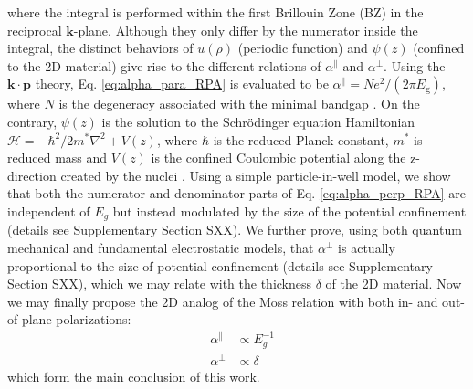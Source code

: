 \documentclass[journal=ancac3,manuscript=article,email=true,hyperref=true,keywords=false]{achemso}
\begin{document}
where the integral is performed within the first Brillouin Zone (BZ)
in the reciprocal $\mathbf{k}$-plane. Although they only differ by the
numerator inside the integral, the distinct behaviors of $u(\rho)$
(periodic function) and $\psi(z)$ (confined to the 2D material) give
rise to the different relations of $\alpha^{\parallel}$ and
$\alpha^{\perp}$. Using the $\mathbf{k} \cdot \mathbf{p}$ theory,
Eq. \ref{eq:alpha_para_RPA} is evaluated to be
$\alpha^{\parallel} = N e^{2}/(2\pi E_{\mathrm{g}})$, where $N$ is the
degeneracy associated with the minimal bandgap
\cite{Jiang_2017_Eg_Eb}. On the contrary, $\psi(z)$ is the solution to
the Schr\"{o}dinger equation Hamiltonian
$\mathcal{H} = -\hbar^{2}/2m^{*} \nabla^{2} + V(z)$, where $\hbar$ is
the reduced Planck constant, $m^{*}$ is reduced mass and $V(z)$ is the
confined Coulombic potential along the z-direction created by the
nuclei \cite{davies_physics_1997,ihn_semiconductor_2009}. Using a
simple particle-in-well model, we show that both the numerator and
denominator parts of Eq. \ref{eq:alpha_perp_RPA} are independent of
$E_{g}$ but instead modulated by the size of the potential confinement
(details see Supplementary Section SXX). We further prove,
using both quantum mechanical and fundamental electrostatic models,
that $\alpha^{\perp}$ is actually proportional to the size of
potential confinement (details see Supplementary Section
SXX), which we may relate with the thickness $\delta$ of
the 2D material. Now we may finally propose the 2D analog of the Moss
relation with both in- and out-of-plane polarizations:
\begin{subequations}
\begin{eqnarray}
\label{eq:2D-Moss-para}
  &\alpha^{\parallel} &\propto E_{g}^{-1} \\
  \label{eq:2D-Moss-perp}
  &\alpha^{\perp} & \propto \delta
\end{eqnarray}
\end{subequations}
which form the main conclusion of this work.
\end{document}
